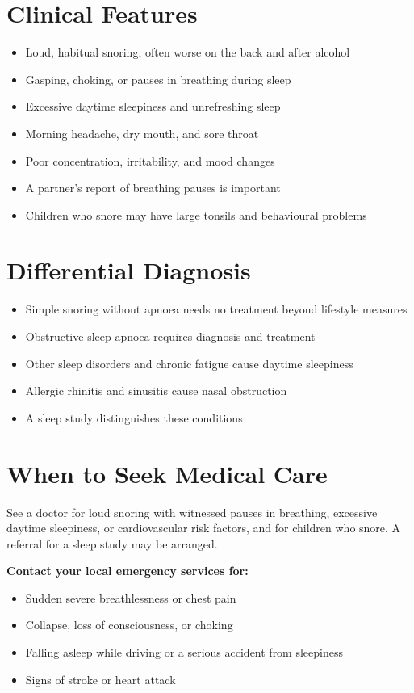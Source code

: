 \section*{Clinical Features}
\begin{itemize}
    \item Loud, habitual snoring, often worse on the back and after alcohol
    \item Gasping, choking, or pauses in breathing during sleep
    \item Excessive daytime sleepiness and unrefreshing sleep
    \item Morning headache, dry mouth, and sore throat
    \item Poor concentration, irritability, and mood changes
    \item A partner's report of breathing pauses is important
    \item Children who snore may have large tonsils and behavioural problems
\end{itemize}

\section*{Differential Diagnosis}
\begin{itemize}
    \item Simple snoring without apnoea needs no treatment beyond lifestyle measures
    \item Obstructive sleep apnoea requires diagnosis and treatment
    \item Other sleep disorders and chronic fatigue cause daytime sleepiness
    \item Allergic rhinitis and sinusitis cause nasal obstruction
    \item A sleep study distinguishes these conditions
\end{itemize}

\section*{When to Seek Medical Care}
See a doctor for loud snoring with witnessed pauses in breathing, excessive daytime sleepiness, or cardiovascular risk factors, and for children who snore. A referral for a sleep study may be arranged.

\textbf{Contact your local emergency services for:}
\begin{itemize}
    \item Sudden severe breathlessness or chest pain
    \item Collapse, loss of consciousness, or choking
    \item Falling asleep while driving or a serious accident from sleepiness
    \item Signs of stroke or heart attack
\end{itemize}

